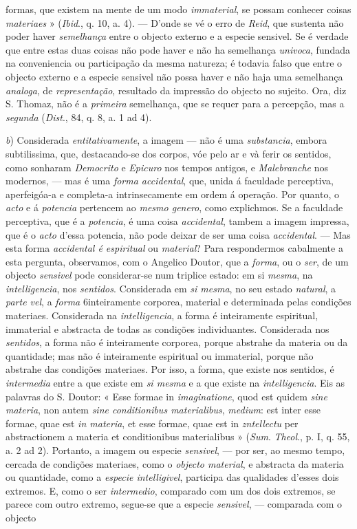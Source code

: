formas, que existem na mente de um modo \emph{immaterial}, se possam conhecer coisas \emph{materiaes} » (\emph{Ibid}., q. 10, a. 4). --- D'onde se vé o erro de \emph{Reid}, que sustenta não poder haver \emph{semelhança} entre o objecto externo e a especie sensivel. Se é verdade que entre estas duas coisas não pode haver e não ha semelhança \emph{univoca}, fundada na conveniencia ou participação da mesma natureza; é todavia falso que entre o objecto externo e a especie sensivel não possa haver e não haja uma semelhança \emph{analoga}, de \emph{representação}, resultado da impressão do objecto no sujeito. Ora, diz S. Thomaz, não é a \emph{primeira} semelhança, que se requer para a percepção, mas a \emph{segunda} (\emph{Dist}., 84, q. 8, a. 1 ad 4).\par \emph{b}) Considerada \emph{entitativamente}, a imagem --- não é uma \emph{substancia}, embora subtilissima, que, destacando-se dos corpos, vóe pelo ar e và ferir os sentidos, como sonharam \emph{Democrito} e \emph{Epicuro} nos tempos antigos, e \emph{Malebranche} nos modernos, --- mas é uma \emph{forma accidental}, que, unida á faculdade perceptiva, aperfeigóa-a e completa-a intrinsecamente em ordem á operação. Por quanto, o \emph{acto} e á \emph{potencia} pertencem ao \emph{mesmo genero}, como explichmos. Se a faculdade perceptiva, que é a \emph{potencia}, é uma coisa \emph{accidental}, tambem a imagem impressa, que é o \emph{acto} d'essa potencia, não pode deixar de ser uma coisa \emph{accidental}. --- Mas esta forma \emph{accidental é espiritual} ou \emph{material}? Para respondermos cabalmente a esta pergunta, observamos, com o Angelico Doutor, que a \emph{forma}, ou o \emph{ser}, de um objecto \emph{sensivel} pode considerar-se num triplice estado: em si \emph{mesma}, na \emph{intelligencia}, nos \emph{sentidos}. Considerada em \emph{si mesma}, no seu estado \emph{natural}, a \emph{parte vel}, a \emph{forma} 6inteiramente corporea, material e determinada pelas condições materiaes. Considerada na \emph{intelligencia}, a forma é inteiramente espiritual, immaterial e abstracta de todas as condições individuantes. Considerada nos \emph{sentidos}, a forma não é inteiramente corporea, porque abstrahe da materia ou da quantidade; mas não é inteiramente espiritual ou immaterial, porque não abstrahe das condições materiaes. Por isso, a forma, que existe nos sentidos, é \emph{intermedia} entre a que existe em \emph{si mesma} e a que existe na \emph{intelligencia}. Eis as palavras do S. Doutor: « Esse formae in \emph{imaginatione}, quod est quidem \emph{sine materia}, non autem \emph{sine conditionibus materialibus}, \emph{medium}: est inter esse formae, quae est \emph{in materia}, et esse formae, quae est in \emph{zntellectu} per abstractionem a materia et conditionibus materialibus » (\emph{Sum}. \emph{Theol}., p. I, q. 55, a. 2 ad 2). Portanto, a imagem ou especie \emph{sensivel}, --- por ser, ao mesmo tempo, cercada de condições materiaes, como o \emph{objecto material}, e abstracta da materia ou quantidade, como a \emph{especie intelligivel}, participa das qualidades d'esses dois extremos. E, como o ser \emph{intermedio}, comparado com um dos dois extremos, se parece com outro extremo, segue-se que a especie \emph{sensivel}, --- comparada com o objecto 